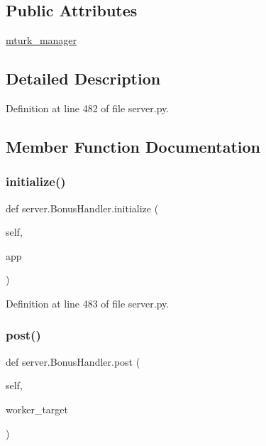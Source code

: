 \subsection*{Public Attributes}
\begin{DoxyCompactItemize}
\item 
\hyperlink{classserver_1_1BonusHandler_a546ed34c4955342e1f0556c43c2a7a38}{mturk\+\_\+manager}
\end{DoxyCompactItemize}


\subsection{Detailed Description}


Definition at line 482 of file server.\+py.



\subsection{Member Function Documentation}
\mbox{\label{classserver_1_1BonusHandler_aa0917e26df68d971bdcea1af70c72220}} 
\subsubsection{\texorpdfstring{initialize()}{initialize()}}
{\footnotesize\ttfamily def server.\+Bonus\+Handler.\+initialize (\begin{DoxyParamCaption}\item[{}]{self,  }\item[{}]{app }\end{DoxyParamCaption})}



Definition at line 483 of file server.\+py.

\mbox{\label{classserver_1_1BonusHandler_a8bd13dda76f95db6e56f29d5a2e0a472}} 
\subsubsection{\texorpdfstring{post()}{post()}}
{\footnotesize\ttfamily def server.\+Bonus\+Handler.\+post (\begin{DoxyParamCaption}\item[{}]{self,  }\item[{}]{worker\+\_\+target }\end{DoxyParamCaption})}

